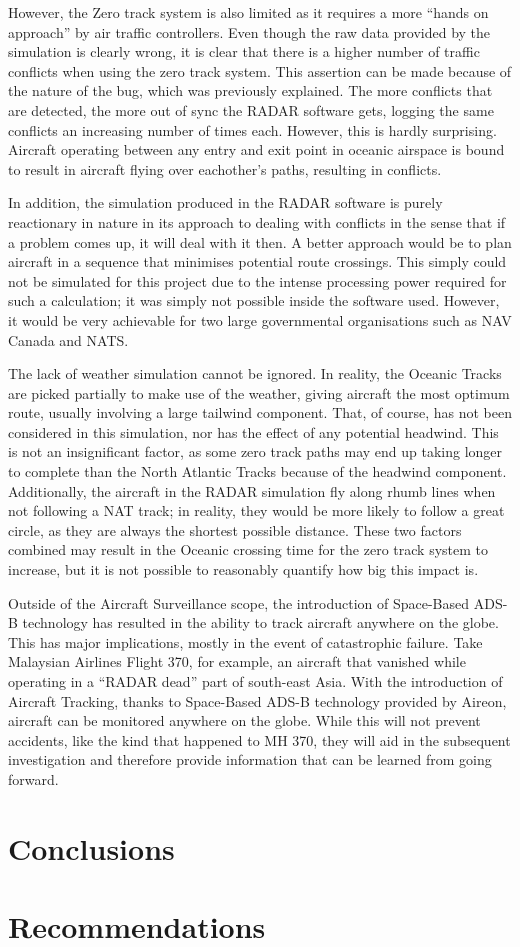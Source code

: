 \documentclass[stu, a4paper, 12pt, floatsintext]{apa7}
\numberwithin{figure}{section}
\numberwithin{table}{section}
\numberwithin{equation}{section}
\begin{document}
However, the Zero track system is also limited as it requires a more “hands on approach” by air traffic controllers. Even though the raw data provided by the simulation is clearly wrong, it is clear that there is a higher number of traffic conflicts when using the zero track system. This assertion can be made because of the nature of the bug, which was previously explained. The more conflicts that are detected, the more out of sync the RADAR software gets, logging the same conflicts an increasing number of times each. However, this is hardly surprising. Aircraft operating between any entry and exit point in oceanic airspace is bound to result in aircraft flying over eachother’s paths, resulting in conflicts. 

In addition, the simulation produced in the RADAR software is purely reactionary in nature in its approach to dealing with conflicts in the sense that if a problem comes up, it will deal with it then. A better approach would be to plan aircraft in a sequence that minimises potential route crossings. This simply could not be simulated for this project due to the intense processing power required for such a calculation; it was simply not possible inside the software used. However, it would be very achievable for two large governmental organisations such as NAV Canada and NATS. 

The lack of weather simulation cannot be ignored. In reality, the Oceanic Tracks are picked partially to make use of the weather, giving aircraft the most optimum route, usually involving a large tailwind component. That, of course, has not been considered in this simulation, nor has the effect of any potential headwind. This is not an insignificant factor, as some zero track paths may end up taking longer to complete than the North Atlantic Tracks because of the headwind component. Additionally, the aircraft in the RADAR simulation fly along rhumb lines when not following a NAT track; in reality, they would be more likely to follow a great circle, as they are always the shortest possible distance. These two factors combined may result in the Oceanic crossing time for the zero track system to increase, but it is not possible to reasonably quantify how big this impact is. 

Outside of the Aircraft Surveillance scope, the introduction of Space-Based ADS-B technology has resulted in the ability to track aircraft anywhere on the globe. This has major implications, mostly in the event of catastrophic failure. Take Malaysian Airlines Flight 370, for example, an aircraft that vanished while operating in a “RADAR dead” part of south-east Asia. With the introduction of Aircraft Tracking, thanks to Space-Based ADS-B technology provided by Aireon, aircraft can be monitored anywhere on the globe. While this will not prevent accidents, like the kind that happened to MH 370, they will aid in the subsequent investigation and therefore provide information that can be learned from going forward.

\newpage
\section{Conclusions}
\section{Recommendations}

\printbibliography
\end{document}
